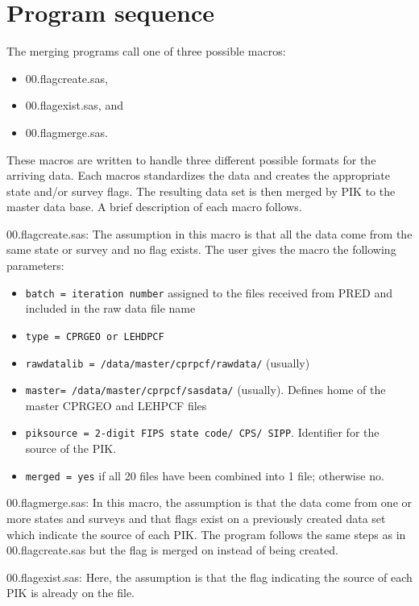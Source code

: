 \section{Program sequence}

The merging programs call one of three possible macros: 
\begin{itemize}
\item 00.flagcreate.sas,
\item 00.flagexist.sas, and 
\item 00.flagmerge.sas. 
\end{itemize}
These macros are written to handle three different possible formats for the
arriving data.  Each macros standardizes the data and creates the
appropriate state and/or survey flags.  The resulting data set is then
merged by PIK to the master data base.  A brief description of each macro
follows.

\begin{description}
\item{00.flagcreate.sas:} The assumption in this macro is that all the data come from the same state or survey and no flag exists.  The user 
gives the macro the following parameters: 
\begin{itemize}
\item \texttt{batch = iteration number} assigned to the files received from PRED and included in the raw data file name 
\item \texttt{type = CPRGEO or LEHDPCF} 
\item \texttt{rawdatalib = /data/master/cprpcf/rawdata/} (usually)
\item \texttt{master=  /data/master/cprpcf/sasdata/} (usually). Defines home of the master CPRGEO and
LEHPCF files 
\item \texttt{piksource = 2-digit FIPS state code/ CPS/ SIPP}.
 Identifier for the source of the PIK.
\item \texttt{merged = yes} if all 20 files have been combined into 1 file; otherwise no.
\end{itemize}

\item{00.flagmerge.sas:} In this macro, the assumption is that the data
come from one or more states and surveys and that flags exist on a
previously created data set which indicate the source of each PIK.  The
program follows the same steps as in 00.flagcreate.sas but the flag is
merged on instead of being created.

\item{00.flagexist.sas:} Here, the assumption is that the flag indicating the source of each PIK is already on the file.
\end{description}

